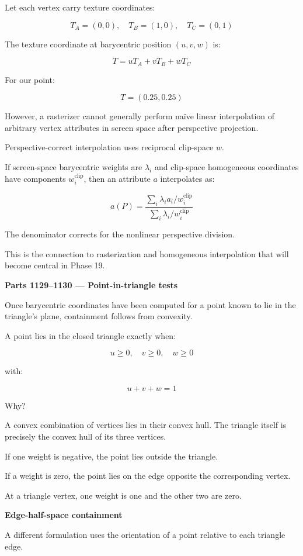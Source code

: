 Let each vertex carry texture coordinates:

\[
T_A=(0,0),\quad T_B=(1,0),\quad T_C=(0,1)
\]

The texture coordinate at barycentric position \((u,v,w)\) is:

\[
T=uT_A+vT_B+wT_C
\]

For our point:

\[
T=(0.25,0.25)
\]

However, a rasterizer cannot generally perform naïve linear interpolation of arbitrary vertex attributes in screen space after perspective projection.

Perspective-correct interpolation uses reciprocal clip-space \(w\).

If screen-space barycentric weights are \(\lambda_i\) and clip-space homogeneous coordinates have components \(w_i^{\mathrm{clip}}\), then an attribute \(a\) interpolates as:

\[
\boxed{ a(P)= \frac{ \sum_i\lambda_i a_i/w_i^{\mathrm{clip}} }{ \sum_i\lambda_i/w_i^{\mathrm{clip}} } }
\]

The denominator corrects for the nonlinear perspective division.

This is the connection to rasterization and homogeneous interpolation that will become central in Phase 19.

\textbf{Parts 1129--1130 --- Point-in-triangle tests}

Once barycentric coordinates have been computed for a point known to lie in the triangle's plane, containment follows from convexity.

A point lies in the closed triangle exactly when:

\[
\boxed{u\ge0,\quad v\ge0,\quad w\ge0}
\]

with:

\[
u+v+w=1
\]

Why?

A convex combination of vertices lies in their convex hull. The triangle itself is precisely the convex hull of its three vertices.

If one weight is negative, the point lies outside the triangle.

If a weight is zero, the point lies on the edge opposite the corresponding vertex.

At a triangle vertex, one weight is one and the other two are zero.

\textbf{Edge-half-space containment}

A different formulation uses the orientation of a point relative to each triangle edge.

